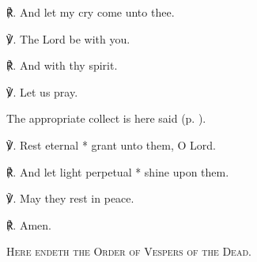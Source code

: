 ℟. And let my cry come unto thee.

℣. The Lord be with you.

℟. And with thy spirit.

℣. Let us pray.

\begin{rubric}
    {The appropriate collect is here said (p. \pageref{dead}).}
\end{rubric}
℣. Rest eternal * grant unto them, O Lord.

℟. And let light perpetual * shine upon them.

℣. May they rest in peace.

℟. Amen.

\begin{center}
    \textsc{Here endeth the Order of Vespers of the Dead.}
\end{center}